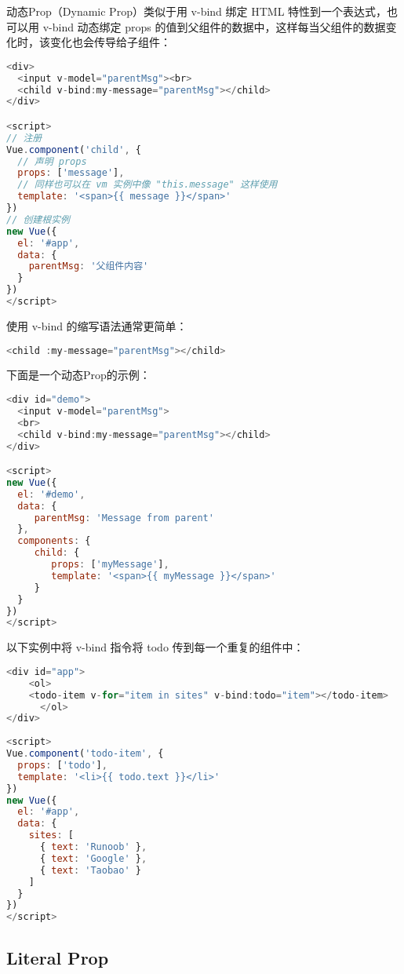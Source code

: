 动态Prop（Dynamic Prop）类似于用 v-bind 绑定 HTML 特性到一个表达式，也可以用 v-bind 动态绑定 props 的值到父组件的数据中，这样每当父组件的数据变化时，该变化也会传导给子组件：

\begin{lstlisting}[language=JavaScript]
<div>
  <input v-model="parentMsg"><br>
  <child v-bind:my-message="parentMsg"></child>
</div>

<script>
// 注册
Vue.component('child', {
  // 声明 props
  props: ['message'],
  // 同样也可以在 vm 实例中像 "this.message" 这样使用
  template: '<span>{{ message }}</span>'
})
// 创建根实例
new Vue({
  el: '#app',
  data: {
    parentMsg: '父组件内容'
  }
})
</script>
\end{lstlisting}

使用 v-bind 的缩写语法通常更简单：

\begin{lstlisting}[language=JavaScript]
<child :my-message="parentMsg"></child>
\end{lstlisting}

下面是一个动态Prop的示例：

\begin{lstlisting}[language=JavaScript]
<div id="demo">
  <input v-model="parentMsg">
  <br>
  <child v-bind:my-message="parentMsg"></child>
</div>

<script>
new Vue({
  el: '#demo',
  data: {
     parentMsg: 'Message from parent'
  },
  components: {
     child: {
        props: ['myMessage'],
        template: '<span>{{ myMessage }}</span>'
     }
  } 
})
</script>
\end{lstlisting}


以下实例中将 v-bind 指令将 todo 传到每一个重复的组件中：

\begin{lstlisting}[language=JavaScript]
<div id="app">
    <ol>
    <todo-item v-for="item in sites" v-bind:todo="item"></todo-item>
      </ol>
</div>
 
<script>
Vue.component('todo-item', {
  props: ['todo'],
  template: '<li>{{ todo.text }}</li>'
})
new Vue({
  el: '#app',
  data: {
    sites: [
      { text: 'Runoob' },
      { text: 'Google' },
      { text: 'Taobao' }
    ]
  }
})
</script>
\end{lstlisting}

\subsection{Literal Prop}


